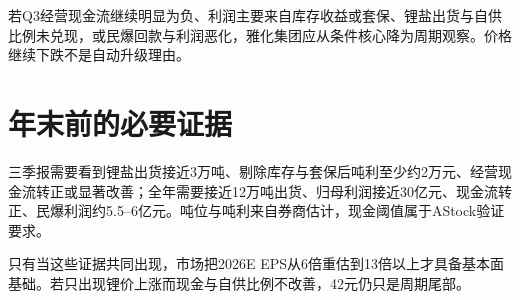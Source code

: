 \begin{riskbox}[降级条件]
若Q3经营现金流继续明显为负、利润主要来自库存收益或套保、锂盐出货与自供比例未兑现，或民爆回款与利润恶化，雅化集团应从条件核心降为周期观察。价格继续下跌不是自动升级理由。
\end{riskbox}

\section{年末前的必要证据}

三季报需要看到锂盐出货接近3万吨、剔除库存与套保后吨利至少约2万元、经营现金流转正或显著改善；全年需要接近12万吨出货、归母利润接近30亿元、现金流转正、民爆利润约5.5--6亿元。吨位与吨利来自券商估计，现金阈值属于AStock验证要求。

只有当这些证据共同出现，市场把2026E EPS从6倍重估到13倍以上才具备基本面基础。若只出现锂价上涨而现金与自供比例不改善，42元仍只是周期尾部。

\clearpage

